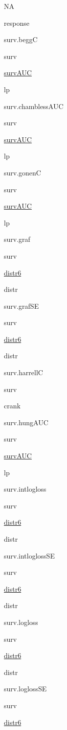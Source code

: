 \documentclass[]{article}
\begin{document}
NA

response

surv.beggC

surv

\href{https://cran.r-project.org/package=survAUC}{survAUC}

lp

surv.chamblessAUC

surv

\href{https://cran.r-project.org/package=survAUC}{survAUC}

lp

surv.gonenC

surv

\href{https://cran.r-project.org/package=survAUC}{survAUC}

lp

surv.graf

surv

\href{https://cran.r-project.org/package=distr6}{distr6}

distr

surv.grafSE

surv

\href{https://cran.r-project.org/package=distr6}{distr6}

distr

surv.harrellC

surv

crank

surv.hungAUC

surv

\href{https://cran.r-project.org/package=survAUC}{survAUC}

lp

surv.intlogloss

surv

\href{https://cran.r-project.org/package=distr6}{distr6}

distr

surv.intloglossSE

surv

\href{https://cran.r-project.org/package=distr6}{distr6}

distr

surv.logloss

surv

\href{https://cran.r-project.org/package=distr6}{distr6}

distr

surv.loglossSE

surv

\href{https://cran.r-project.org/package=distr6}{distr6}
\end{document}
